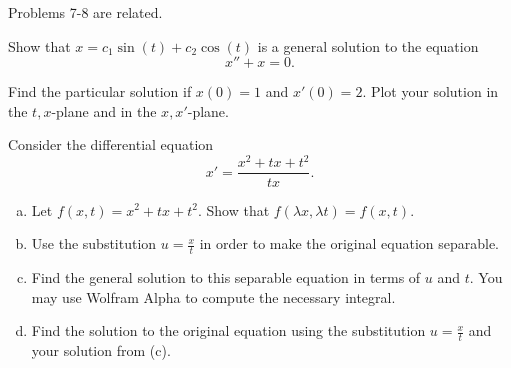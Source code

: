 \documentclass[12pt]{article} %
\begin{document}
\begin{center}
    Problems 7-8 are related.
\end{center}
\begin{problem}
    Show that $x=c_1\sin(t)+c_2\cos(t)$ is a general solution to the equation
    \[
        x''+x=0.
    \]
\end{problem}

\begin{problem}
    Find the particular solution if $x(0)=1$ and $x'(0)=2$. Plot your solution in the $t,x$-plane and in the $x,x'$-plane. 
\end{problem}

\begin{problem}
    Consider the differential equation
    \[
    x'=\frac{x^2+tx+t^2}{tx}.
    \]
    \begin{enumerate}[(a)]
        \item Let $f(x,t)=x^2+tx+t^2$.  Show that $f(\lambda x, \lambda t)=f(x,t)$.
        \item Use the substitution $u=\frac{x}{t}$ in order to make the original equation separable.
        \item Find the general solution to this separable equation in terms of $u$ and $t$. You may use Wolfram Alpha to compute the necessary integral.
        \item Find the solution to the original equation using the substitution $u=\frac{x}{t}$ and your solution from (c).
    \end{enumerate}
\end{problem}
\end{document}
